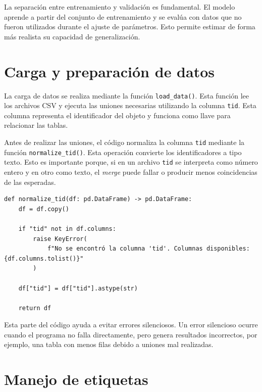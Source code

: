\documentclass[12pt,letterpaper]{article}
\begin{document}
La separación entre entrenamiento y validación es fundamental. El modelo aprende a partir del conjunto de entrenamiento y se evalúa con datos que no fueron utilizados durante el ajuste de parámetros. Esto permite estimar de forma más realista su capacidad de generalización.

\section{Carga y preparación de datos}

La carga de datos se realiza mediante la función \texttt{load\_data()}. Esta función lee los archivos CSV y ejecuta las uniones necesarias utilizando la columna \texttt{tid}. Esta columna representa el identificador del objeto y funciona como llave para relacionar las tablas.

Antes de realizar las uniones, el código normaliza la columna \texttt{tid} mediante la función \texttt{normalize\_tid()}. Esta operación convierte los identificadores a tipo texto. Esto es importante porque, si en un archivo \texttt{tid} se interpreta como número entero y en otro como texto, el \textit{merge} puede fallar o producir menos coincidencias de las esperadas.

\begin{lstlisting}[style=pythonstyle, caption={Normalización de la columna tid}]
def normalize_tid(df: pd.DataFrame) -> pd.DataFrame:
    df = df.copy()

    if "tid" not in df.columns:
        raise KeyError(
            f"No se encontró la columna 'tid'. Columnas disponibles: {df.columns.tolist()}"
        )

    df["tid"] = df["tid"].astype(str)

    return df
\end{lstlisting}

Esta parte del código ayuda a evitar errores silenciosos. Un error silencioso ocurre cuando el programa no falla directamente, pero genera resultados incorrectos, por ejemplo, una tabla con menos filas debido a uniones mal realizadas.

\section{Manejo de etiquetas}
\end{document}
